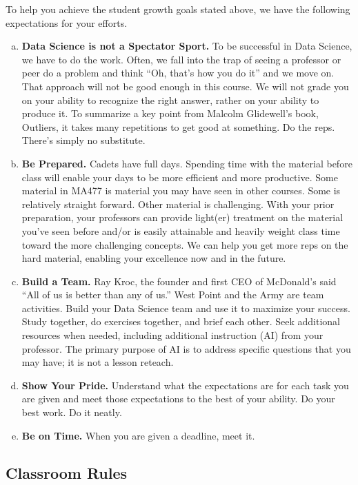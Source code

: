 \documentclass[11pt]{article}
\theoremstyle{plain}
\theoremstyle{definition}
\begin{document}
To help you achieve the student growth goals stated above, we have the following expectations for your efforts.  

\begin{enumerate}[a.]
\item {\bf Data Science is not a Spectator Sport.} To be successful in Data Science, we have to do the work. Often, we fall into the trap of seeing a professor or peer do a problem and think “Oh, that’s how you do it” and we move on. That approach will not be good enough in this course. We will not grade you on your ability to recognize the right answer, rather on your ability to produce it. To summarize a key point from Malcolm Glidewell’s book, Outliers, it takes many repetitions to get good at something. Do the reps. There’s simply no substitute.

\item {\bf Be Prepared.} Cadets have full days. Spending time with the material before class will enable your days to be more efficient and more productive. Some material in MA477 is material you may have seen in other courses. Some is relatively straight forward. Other material is challenging. With your prior preparation, your professors can provide light(er) treatment on the material you’ve seen before and/or is easily attainable and heavily weight class time toward the more challenging concepts. We can help you get more reps on the hard material, enabling your excellence now and in the future.

\item {\bf Build a Team.} Ray Kroc, the founder and first CEO of McDonald’s said “All of us is better than any of us.” West Point and the Army are team activities. Build your Data Science team and use it to maximize your success. Study together, do exercises together, and brief each other. Seek additional resources when needed, including additional instruction (AI) from your professor. The primary purpose of AI is to address specific questions that you may have; it is not a lesson reteach.

\item {\bf Show Your Pride.} Understand what the expectations are for each task you are given and meet those expectations to the best of your ability. Do your best work. Do it neatly. 

\item {\bf Be on Time.}  When you are given a deadline, meet it.
\end{enumerate}


\subsection{Classroom Rules}
\end{document}
